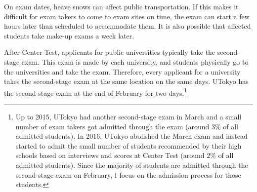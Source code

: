 \documentclass[12pt,letterpaper]{article}
\begin{document}
On exam dates, heave snows can affect public transportation.
If this makes it difficult for exam takers to come to exam sites on time, the exam can start a few hours later than scheduled to accommodate them.
It is also possible that affected students take make-up exams a week later.


After Center Test, applicants for public universities typically take the second-stage exam.
This exam is made by each university, and students physically go to the universities and take the exam.
Therefore, every applicant for a university takes the second-stage exam at the same location on the same days.
UTokyo has the second-stage exam at the end of February for two days.\footnote{
  Up to 2015, UTokyo had another second-stage exam in March and a small number of exam takers got admitted through the exam (around 3\% of all admitted students).
  In 2016, UTokyo abolished the March exam and instead started to admit the small number of students recommended by their high schools based on interviews and scores at Center Test (around 2\% of all admitted students).
  Since the majority of students are admitted through the second-stage exam on February, I focus on the admission process for those students. 
}
\end{document}
